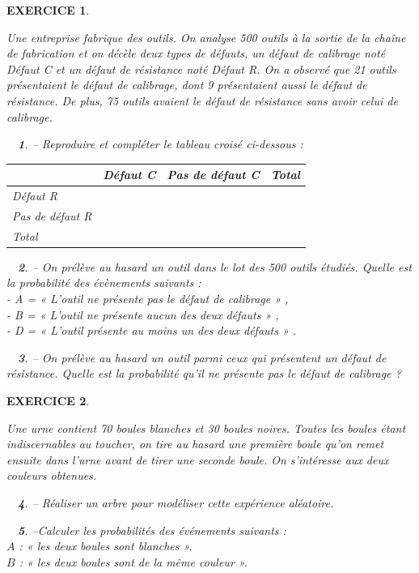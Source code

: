 \documentclass[a4paper]{article}   %
\renewcommand{\(}{\left(}
\renewcommand{\)}{\right)}
\newtheorem{ques}{~}
\newenvironment{qu}{\begin{ques}--} {\end{ques}}
\newtheorem{EXO}{\large EXERCICE }
\newenvironment{EX}   { \setcounter{ques}{0} \begin{EXO} \hrulefill ~\vspace{0.3cm}

\normalfont}    {\end{EXO} \medskip}
\begin{document}
\begin{EX}
Une entreprise fabrique des outils. On analyse 500 outils à la sortie de la chaîne de fabrication et on décèle deux types de défauts, un défaut de calibrage noté Défaut C et un défaut de résistance noté Défaut R. On a observé que 21 outils présentaient le défaut de calibrage, dont 9 présentaient aussi le défaut de résistance. De plus, 75 outils avaient le défaut de résistance sans avoir celui de calibrage.

\begin{qu}
Reproduire et compléter le tableau croisé ci-dessous :
\begin{center}
\begin{tabular}{|p{4cm}| p{4cm}| p{4cm}| p{4cm}|}		
\hline							
 & Défaut C & Pas de défaut C & Total \\
\hline
Défaut R & & &\\
\hline
Pas de défaut R & & &\\
\hline
Total & & &\\
\hline
\end{tabular}
\end{center}
\end{qu}
\begin{qu} On prélève au hasard un outil dans le lot des 500 outils étudiés. Quelle est la probabilité des évènements suivants : \\
- A = « L'outil ne présente pas le défaut de calibrage » ,\\
- B = « L'outil ne présente aucun des deux défauts » ,\\
- D = « L'outil présente au moins un des deux défauts » .
\end{qu}
\begin{qu} On prélève au hasard un outil parmi ceux qui présentent un défaut de résistance. Quelle est la probabilité qu'il ne présente pas le défaut de calibrage ?
\end{qu}

\end{EX}
\begin{EX}

Une urne contient 70 boules blanches et 30 boules noires. Toutes les boules étant
indiscernables au toucher, on tire au hasard une première boule qu’on remet ensuite dans
l’urne avant de tirer une seconde boule. On s’intéresse aux deux couleurs obtenues.
\begin{qu}  Réaliser un arbre pour modéliser cette expérience aléatoire.
\end{qu}
\begin{qu}Calculer les probabilités des événements suivants : \\
$A$ : « les deux boules sont blanches ». \\
$B$ : « les deux boules sont de la même couleur ».
\end{qu}

\end{EX}
\end{document}
